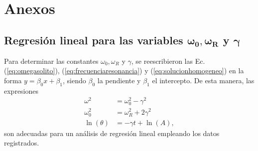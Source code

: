 \section*{Anexos}
\subsection*{Regresión lineal para las variables $\mathbf{\omega_0, \omega_R}$ y $\mathbf{\gamma}$}

Para determinar las constantes $\omega_0, \omega_R$ y $\gamma$, se reescribieron las
Ec. (\ref{eq:omegasolito}), (\ref{eq:frecuenciaresonancia}) y (\ref{eq:solucionhomogeneo})
en la forma $y = \beta_0 x + \beta_1$, siendo $\beta_0$ la pendiente y $\beta_1$ el intercepto.
De esta manera, las expresiones
\begin{align*}
	\omega^2 &= \omega_0^2 - \gamma^2 \\
	\omega_0^2 &= \omega_R^2 + 2\gamma^2 \\
	\ln(\theta) &= -\gamma t + \ln(A),
\end{align*}
son adecuadas para un análisis de regresión lineal empleando los datos registrados.
